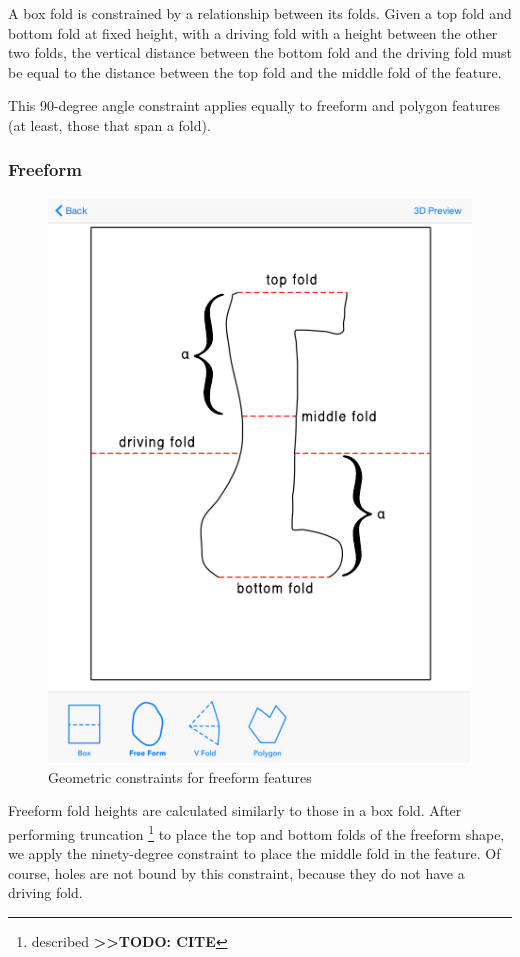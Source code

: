 A box fold is constrained by a relationship between its folds. Given a
top fold and bottom fold at fixed height, with a driving fold with a
height between the other two folds, the vertical distance between the
bottom fold and the driving fold must be equal to the distance between
the top fold and the middle fold of the feature.

This 90-degree angle constraint applies equally to freeform and polygon
features (at least, those that span a fold).

\subsubsection{Freeform}\label{freeform}

\begin{figure}[htbp]
\centering
\includegraphics{figures/45_Tech_Constraints/freeformConstraints.pdf}
\caption{Geometric constraints for freeform features}
\end{figure}

Freeform fold heights are calculated similarly to those in a box fold.
After performing truncation \footnote{described
  \textbf{\textgreater{}\textgreater{}TODO: CITE}} to place the top and
bottom folds of the freeform shape, we apply the ninety-degree
constraint to place the middle fold in the feature. Of course, holes are
not bound by this constraint, because they do not have a driving fold.

